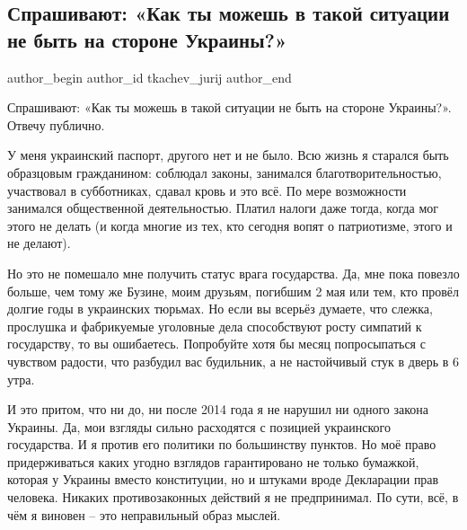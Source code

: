  
 
 
 
 
 
\subsection{Спрашивают: «Как ты можешь в такой ситуации не быть на стороне Украины?»}
\label{sec:23_02_2022.tg.tkachev_jurij.2.sprashivajut_storona_ukrainy}
 
\ifcmt
 author_begin
   author_id tkachev_jurij
 author_end
\fi

Спрашивают: «Как ты можешь в такой ситуации не быть на стороне Украины?».
Отвечу публично.

У меня украинский паспорт, другого нет и не было. Всю жизнь я старался быть
образцовым гражданином: соблюдал законы, занимался благотворительностью,
участвовал в субботниках, сдавал кровь и это всё. По мере возможности занимался
общественной деятельностью. Платил налоги даже тогда, когда мог этого не делать
(и когда многие из тех, кто сегодня вопят о патриотизме, этого и не делают). 

Но это не помешало мне получить статус врага государства. Да, мне пока повезло
больше, чем тому же Бузине, моим друзьям, погибшим 2 мая или тем, кто провёл
долгие годы в украинских тюрьмах. Но если вы всерьёз думаете, что слежка,
прослушка и фабрикуемые уголовные дела способствуют росту симпатий к
государству, то вы ошибаетесь. Попробуйте хотя бы месяц попросыпаться с
чувством радости, что разбудил вас будильник, а не настойчивый стук в дверь в 6
утра. 

И это притом, что ни до, ни после 2014 года я не нарушил ни одного закона
Украины. Да, мои взгляды сильно расходятся с позицией украинского государства.
И я против его политики по большинству пунктов. Но моё право придерживаться
каких угодно взглядов гарантировано не только бумажкой, которая у Украины
вместо конституции, но и штуками вроде Декларации прав человека. Никаких
противозаконных действий я не предпринимал. По сути, всё, в чём я виновен – это
неправильный образ мыслей.

